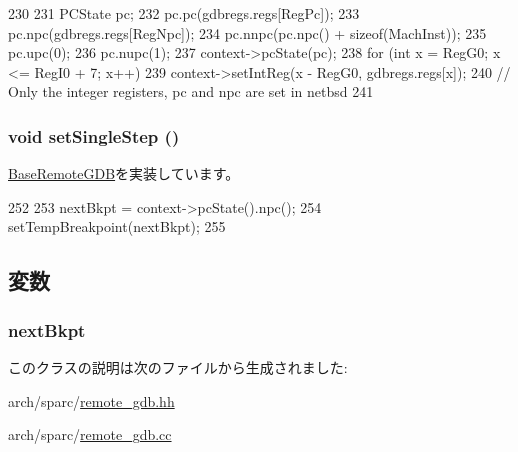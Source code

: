 \begin{DoxyCode}
230 {
231     PCState pc;
232     pc.pc(gdbregs.regs[RegPc]);
233     pc.npc(gdbregs.regs[RegNpc]);
234     pc.nnpc(pc.npc() + sizeof(MachInst));
235     pc.upc(0);
236     pc.nupc(1);
237     context->pcState(pc);
238     for (int x = RegG0; x <= RegI0 + 7; x++)
239         context->setIntReg(x - RegG0, gdbregs.regs[x]);
240     // Only the integer registers, pc and npc are set in netbsd
241 }
\end{DoxyCode}
\hypertarget{classSparcISA_1_1RemoteGDB_a40d5da340fdb741de8cd3ffbc69708fe}{
\subsubsection[{setSingleStep}]{\setlength{\rightskip}{0pt plus 5cm}void setSingleStep ()}}
\label{classSparcISA_1_1RemoteGDB_a40d5da340fdb741de8cd3ffbc69708fe}


\hyperlink{classBaseRemoteGDB_a253d4b1107e84fe80036d1826067741a}{BaseRemoteGDB}を実装しています。


\begin{DoxyCode}
252 {
253     nextBkpt = context->pcState().npc();
254     setTempBreakpoint(nextBkpt);
255 }
\end{DoxyCode}


\subsection{変数}
\hypertarget{classSparcISA_1_1RemoteGDB_a48116c182f6c43f3f31861355f288231}{
\subsubsection[{nextBkpt}]{ {\bf nextBkpt}}}
\label{classSparcISA_1_1RemoteGDB_a48116c182f6c43f3f31861355f288231}


このクラスの説明は次のファイルから生成されました:\begin{DoxyCompactItemize}
\item 
arch/sparc/\hyperlink{arch_2sparc_2remote__gdb_8hh}{remote\_\-gdb.hh}\item 
arch/sparc/\hyperlink{arch_2sparc_2remote__gdb_8cc}{remote\_\-gdb.cc}\end{DoxyCompactItemize}
